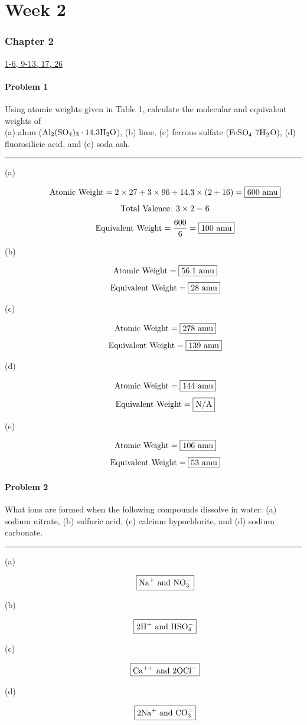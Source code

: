 \part*{Week 2}
\section*{Chapter 2}
\underline{1-6, 9-13, 17, 26}
\subsection*{Problem 1}
Using atomic weights given in Table 1, calculate the molecular and equivalent weights of \\(a) alum
(\(\textnormal{Al}_2(\textnormal{SO}_4)_3\cdot 14.3\textnormal{H}_2\textnormal{O}\)), (b) lime, (c) ferrous sulfate (FeS\(\textnormal{O}_4\)\(\cdot\)7\(\textnormal{H}_2\)O), (d) fluorosilicic acid, and (e) soda ash.\\
\rule{5cm}{1pt}
\begin{description}
    \item [(a)]\[\textnormal{Atomic Weight} = 2\times 27+3\times 96+14.3\times(2+16)=\boxed{600\textnormal{ amu}}\]
    \[\textnormal{Total Valence: } 3\times 2 = 6\]
    \[\textnormal{Equivalent Weight} = \frac{600}{6}=\boxed{100\textnormal{ amu}}\]
    \item [(b)]
    \[\textnormal{Atomic Weight} =\boxed{56.1\textnormal{ amu}}\]
    \[\textnormal{Equivalent Weight} =\boxed{28\textnormal{ amu}}\]
    \item [(c)]
    \[\textnormal{Atomic Weight} =\boxed{278\textnormal{ amu}}\]
    \[\textnormal{Equivalent Weight} =\boxed{139\textnormal{ amu}}\]
    \item [(d)]
    \[\textnormal{Atomic Weight} =\boxed{144\textnormal{ amu}}\]
    \[\textnormal{Equivalent Weight} =\boxed{\textnormal{N/A}}\]
    \item [(e)]
    \[\textnormal{Atomic Weight} =\boxed{106\textnormal{ amu}}\]
    \[\textnormal{Equivalent Weight} =\boxed{53\textnormal{ amu}}\]
\end{description}
\subsection*{Problem 2}
What ions are formed when the following compounds dissolve in water: (a) sodium nitrate, (b) sulfuric acid, (c) calcium hypochlorite, and (d) sodium carbonate.\\
\rule{5cm}{1pt}
\begin{description}
    \item [(a)]
    \[\boxed{\textnormal{Na}^+\textnormal{ and NO}_3^-}\]
    \item [(b)]
    \[\boxed{\textnormal{2H}^+\textnormal{ and HSO}_4^-}\]
    \item [(c)]
    \[\boxed{\textnormal{Ca}^{++}\textnormal{ and 2OCl}^-}\]
    \item [(d)]
    \[\boxed{\textnormal{2Na}^+\textnormal{ and CO}_3^{=}}\]
\end{description}
